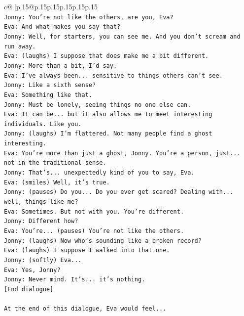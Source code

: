 \documentclass{article}
\begin{document}
{\begin{supertabular}{c@{$\;$}|p{.15\linewidth}@{}p{.15\linewidth}p{.15\linewidth}p{.15\linewidth}p{.15\linewidth}p{.15\linewidth}}
{{{\\ 
\texttt{Jonny: You're not like the others, are you, Eva?} \\
\texttt{Eva: And what makes you say that?} \\
\texttt{Jonny: Well, for starters, you can see me. And you don't scream and run away.} \\
\texttt{Eva: (laughs) I suppose that does make me a bit different.} \\
\texttt{Jonny: More than a bit, I'd say. } \\
\texttt{Eva: I've always been... sensitive to things others can't see. } \\
\texttt{Jonny: Like a sixth sense?} \\
\texttt{Eva: Something like that. } \\
\texttt{Jonny: Must be lonely, seeing things no one else can.} \\
\texttt{Eva: It can be... but it also allows me to meet interesting individuals. Like you.} \\
\texttt{Jonny: (laughs) I'm flattered. Not many people find a ghost interesting.} \\
\texttt{Eva: You're more than just a ghost, Jonny. You're a person, just... not in the traditional sense.} \\
\texttt{Jonny: That's... unexpectedly kind of you to say, Eva.} \\
\texttt{Eva: (smiles) Well, it's true.} \\
\texttt{Jonny: (pauses) Do you... Do you ever get scared? Dealing with... well, things like me?} \\
\texttt{Eva: Sometimes. But not with you. You're different.} \\
\texttt{Jonny: Different how?} \\
\texttt{Eva: You're... (pauses) You're not like the others.} \\
\texttt{Jonny: (laughs) Now who's sounding like a broken record?} \\
\texttt{Eva: (laughs) I suppose I walked into that one.} \\
\texttt{Jonny: (softly) Eva... } \\
\texttt{Eva: Yes, Jonny?} \\
\texttt{Jonny: Never mind. It's... it's nothing.} \\
\texttt{{[}End dialogue{]}} \\
\\ 
\texttt{At the end of this dialogue, Eva would feel...} \\
}}}
\end{supertabular}}
\end{document}
